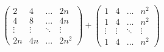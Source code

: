 \documentclass[../../main.tex]{subfiles}
\begin{document}
\begin{equation*}
\begin{split}
      \begin{pmatrix}
        2 & 4 & \dots & 2n \\
        4 & 8 & \dots & 4n \\
        \vdots & \vdots & \ddots & \vdots \\
        2n & 4n & \dots & 2n^2
      \end{pmatrix} +
      \begin{pmatrix}
        1 & 4 & \dots & n^2 \\
        1 & 4 & \dots & n^2 \\
        \vdots & \vdots & \ddots & \vdots \\
        1 & 4 & \dots & n^2
      \end{pmatrix}
    \end{split}
  \end{equation*}
\end{document}
